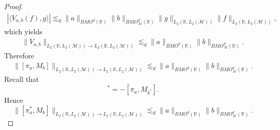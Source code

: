 \documentclass[oneside,english,a4wide]{amsart}
\numberwithin{equation}{section}
\numberwithin{figure}{section}
\theoremstyle{plain}
\theoremstyle{plain}
\theoremstyle{definition}
\theoremstyle{plain}
\theoremstyle{remark}
\theoremstyle{definition}
\theoremstyle{remark}
\theoremstyle{definition}
\newcommand{\8}{\infty}
\begin{document}
\begin{proof}
\begin{equation*}
\begin{aligned}
			|\langle V_{a,b}(f),g\rangle|\lesssim_d \|a\|_{BMO^d(\mathbb{R})}\|b\|_{BMO^d_{\mathcal{M}}(\mathbb{R})}\|g\|_{L_2(\mathbb{R},L_2(\mathcal{M}))}\|f\|_{L_2(\mathbb{R},L_2(\mathcal{M}))},
		\end{aligned}
	\end{equation*}
	which yields
	\begin{equation*}
		\begin{aligned}
			\|V_{a,b}\|_{L_2(\mathbb{R},L_2(\mathcal{M}))\to L_2(\mathbb{R},L_2(\mathcal{M}))}\lesssim_d \|a\|_{BMO^d(\mathbb{R})}\|b\|_{BMO^d_{\mathcal{M}}(\mathbb{R})}.
		\end{aligned}
	\end{equation*}
	Therefore
	\begin{equation*}
		\begin{aligned}
			\|[\pi_a,M_b]\|_{L_2(\mathbb{R},L_2(\mathcal{M}))\to L_2(\mathbb{R},L_2(\mathcal{M}))}\lesssim_d \|a\|_{BMO^d(\mathbb{R})}\|b\|_{BMO^d_{\mathcal{M}}(\mathbb{R})}.
		\end{aligned}
	\end{equation*}
Recall that 
	\begin{equation*}
	[\pi_a^*,M_b]^*=-[\pi_a,M_{b^*}].
\end{equation*}
Hence
\begin{equation*}
	\|[\pi_a^*,M_b]\|_{L_2(\mathbb{R},L_2(\mathcal{M}))\to L_2(\mathbb{R},L_2(\mathcal{M}))}\lesssim_d \|a\|_{BMO^d(\mathbb{R})}\|b\|_{BMO^d_{\mathcal{M}}(\mathbb{R})}.
\end{equation*}
	
	
	
	
	
	
\end{proof}
\end{document}
